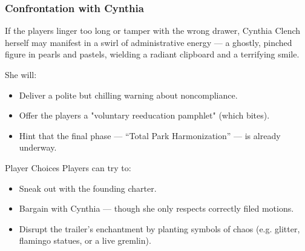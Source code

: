 \subsubsection*{Confrontation with Cynthia}
If the players linger too long or tamper with the wrong drawer, Cynthia Clench herself may manifest in a swirl of administrative energy — a ghostly, pinched figure in pearls and pastels, wielding a radiant clipboard and a terrifying smile.

She will:
\begin{itemize}
    \item Deliver a polite but chilling warning about noncompliance.
    \item Offer the players a "voluntary reeducation pamphlet" (which bites).
    \item Hint that the final phase — “Total Park Harmonization” — is already underway.
\end{itemize}

\begin{CommentBox}{Player Choices}
Players can try to:
\begin{itemize}
    \item Sneak out with the founding charter.
    \item Bargain with Cynthia — though she only respects correctly filed motions.
    \item Disrupt the trailer’s enchantment by planting symbols of chaos (e.g. glitter, flamingo statues, or a live gremlin).
\end{itemize}
\end{CommentBox}

